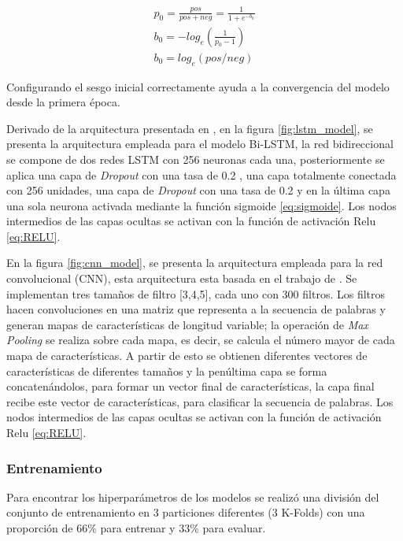 \begin{equation}
\label{eq:bias}
\begin{split}
    p_0= \frac{pos}{pos+neg}= \frac{1}{1+e^{-b_0}}\\
    b_0=-log_e(\frac{1}{p_0-1})\\
    b_0=log_e(pos/neg)
\end{split}
\end{equation}

Configurando el sesgo inicial correctamente ayuda a la convergencia del modelo desde la primera época.

Derivado de la arquitectura presentada en  \citep{adhikari2019rethinking}, en la figura  \ref{fig:lstm_model}, se presenta la arquitectura empleada para el modelo Bi-LSTM, la red bidireccional se compone de dos redes LSTM con 256 neuronas cada una, posteriormente se aplica una capa de \textit{Dropout} con una tasa de 0.2 , una capa totalmente conectada con 256 unidades, una capa de \textit{Dropout} con una tasa de 0.2 y en la última capa una sola neurona activada mediante la función sigmoide \ref{eq:sigmoide}. Los nodos intermedios de las capas ocultas se activan con la función de activación Relu \ref{eq:RELU}. 


En la figura \ref{fig:cnn_model}, se presenta la arquitectura empleada para la red convolucional (CNN), esta arquitectura esta basada en el trabajo de \citep{kim2014convolutional}. Se implementan tres tamaños de filtro [3,4,5], cada uno con 300 filtros. Los filtros hacen convoluciones en una matriz que representa a la secuencia de palabras y generan mapas de características de longitud variable; la operación de \textit{Max Pooling }se realiza sobre cada mapa, es decir, se calcula el número mayor de cada mapa de características. A partir de esto se obtienen diferentes vectores de características de diferentes tamaños y la penúltima capa se forma concatenándolos, para formar un vector final de características, la capa final recibe este vector de características, para clasificar la secuencia de palabras. Los nodos intermedios de las capas ocultas se activan con la función de activación Relu \ref{eq:RELU}. 



\subsubsection{Entrenamiento}
Para encontrar los hiperparámetros de los modelos se realizó una división del conjunto de entrenamiento en 3 particiones diferentes (3 K-Folds) con una proporción de 66\% para entrenar y 33\% para evaluar.


